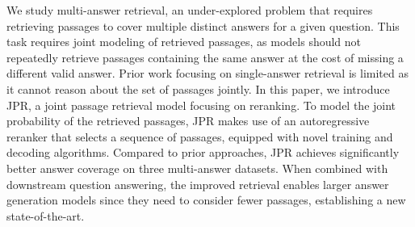We study multi-answer retrieval, an under-explored problem that requires retrieving passages to cover multiple distinct answers for a given question. This task requires joint modeling of retrieved passages, as models should not repeatedly retrieve passages containing the same answer at the cost of missing a different valid answer. Prior work focusing on single-answer retrieval is limited as it cannot reason about the set of passages jointly. In this paper, we introduce JPR, a joint passage retrieval model focusing on reranking. To model the joint probability of the retrieved passages, JPR makes use of an autoregressive reranker that selects a sequence of passages, equipped with novel training and decoding algorithms. Compared to prior approaches, JPR achieves significantly better answer coverage on three multi-answer datasets. When combined with downstream question answering, the improved retrieval enables larger answer generation models since they need to consider fewer passages, establishing a new state-of-the-art.
